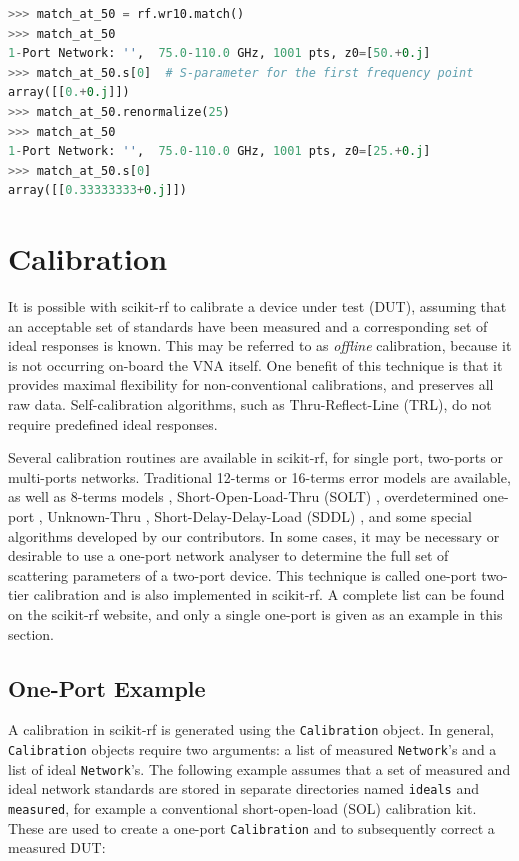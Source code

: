 \documentclass{IEEEjmw}
\begin{document}
\begin{lstlisting}[language=Python]
>>> match_at_50 = rf.wr10.match()
>>> match_at_50
1-Port Network: '',  75.0-110.0 GHz, 1001 pts, z0=[50.+0.j]
>>> match_at_50.s[0]  # S-parameter for the first frequency point
array([[0.+0.j]])
>>> match_at_50.renormalize(25)
>>> match_at_50
1-Port Network: '',  75.0-110.0 GHz, 1001 pts, z0=[25.+0.j]
>>> match_at_50.s[0]
array([[0.33333333+0.j]])
\end{lstlisting}

\section{Calibration}
It is possible with scikit-rf to calibrate a device under test (DUT), assuming that an acceptable set of standards have been measured and a corresponding set of ideal responses is known. This may be referred to as \textit{offline} calibration, because it is not occurring on-board the VNA itself. One benefit of this technique is that it provides maximal flexibility for non-conventional calibrations, and preserves all raw data. Self-calibration algorithms, such as Thru-Reflect-Line (TRL)\cite{engen1979}, do not require predefined ideal responses.

Several calibration routines are available in scikit-rf, for single port, two-ports or multi-ports networks. Traditional 12-terms \cite{marks1997} or 16-terms \cite{silvonen1993} error models are available, as well as 8-terms models \cite{speciale1977}, Short-Open-Load-Thru (SOLT) \cite{kruppa1971}, overdetermined one-port \cite{bauer1974}, Unknown-Thru \cite{ferrero1992}, Short-Delay-Delay-Load (SDDL) \cite{liu2006}, and some special algorithms developed by our contributors. In some cases, it may be necessary or desirable to use a one-port network analyser to determine the full set of scattering parameters of a two-port device. This technique is called one-port two-tier calibration \cite{ou2005} and is also implemented in scikit-rf. A complete list can be found on the scikit-rf website, and only a single one-port is given as an example in this section.

\subsection{One-Port Example}
A calibration in scikit-rf is generated using the \texttt{Calibration} object. In general, \texttt{Calibration} objects require two arguments: a list of measured \texttt{Network}’s and a list of ideal \texttt{Network}’s. The following example assumes that a set of measured and ideal network standards are stored in separate directories named \texttt{ideals} and \texttt{measured}, for example a conventional short-open-load (SOL) calibration kit. These are used to create a one-port \texttt{Calibration} and to subsequently correct a measured DUT:
\end{document}
